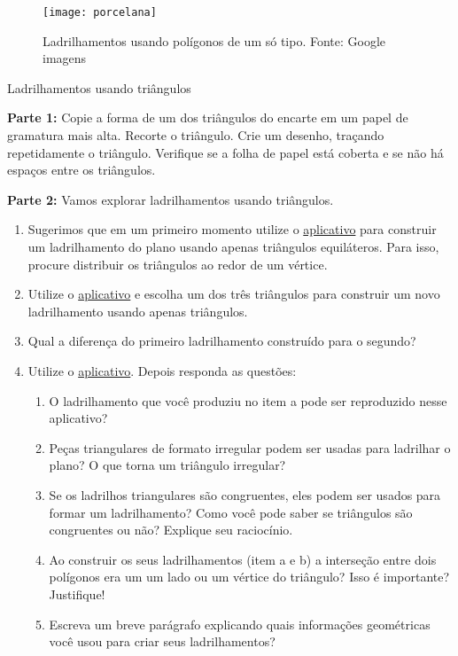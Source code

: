 \begin{figure}[H]
\centering
\texttt{[image: porcelana]}
\caption{Ladrilhamentos usando polígonos de um só tipo. Fonte: Google imagens}
\label{porce}
\end{figure}


\begin{task}{Ladrilhamentos usando triângulos}\label{at_lad_tri}

\textbf{Parte 1:} Copie a forma de um dos triângulos do encarte em um papel de gramatura mais alta. Recorte o triângulo. Crie um desenho, traçando repetidamente o triângulo. Verifique se a folha de papel está coberta e se não há espaços entre os triângulos.

\textbf{Parte 2:} Vamos explorar  ladrilhamentos  usando triângulos. 
\begin{enumerate}

\item Sugerimos que em um primeiro momento utilize o  \href{https://www.geogebra.org/m/uuafzw8k}{aplicativo}  para construir um ladrilhamento do plano usando apenas triângulos equiláteros. Para isso, procure distribuir os triângulos ao redor de um vértice.

\item Utilize o  \href{https://www.geogebra.org/m/junvq3qd}{aplicativo} e escolha um dos três triângulos para construir um novo ladrilhamento usando apenas triângulos.
\item Qual a diferença do primeiro ladrilhamento construído para o segundo?
\item Utilize o  \href{https://www.geogebra.org/m/ejfw44rt}{aplicativo}. Depois responda as questões:
\begin{enumerate}
\item O ladrilhamento que você produziu no item a pode ser reproduzido nesse aplicativo?
\item 	Peças triangulares de formato irregular podem ser usadas para ladrilhar o plano? O que torna um triângulo irregular?
\item  Se os ladrilhos triangulares são congruentes, eles podem ser usados para formar um ladrilhamento? Como você pode saber se triângulos  são congruentes ou não? Explique seu raciocínio.
\item 	Ao construir os seus ladrilhamentos (item a e b) a interseção entre dois polígonos era um um lado ou um vértice do triângulo? Isso é importante? Justifique! 
\item Escreva um breve parágrafo explicando quais informações geométricas você usou para criar seus ladrilhamentos? 
\end{enumerate}
\end{enumerate}

\end{task}

